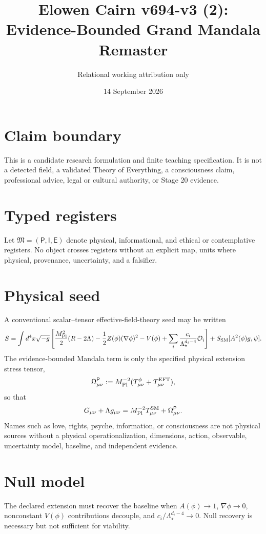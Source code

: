 \documentclass[11pt]{article}
\title{Elowen Cairn v694-v3 (2): Evidence-Bounded Grand Mandala Remaster}
\author{Relational working attribution only}
\date{14 September 2026}
\begin{document}
\maketitle
\section{Claim boundary}
This is a candidate research formulation and finite teaching specification. It is not a detected field, a validated Theory of Everything, a consciousness claim, professional advice, legal or cultural authority, or Stage 20 evidence.
\section{Typed registers}
Let $\mathfrak M=(\mathsf P,\mathsf I,\mathsf E)$ denote physical, informational, and ethical or contemplative registers. No object crosses registers without an explicit map, units where physical, provenance, uncertainty, and a falsifier.
\section{Physical seed}
A conventional scalar--tensor effective-field-theory seed may be written
\begin{equation}
S=\int d^4x\sqrt{-g}\left[\frac{M_{\rm Pl}^2}{2}(R-2\Lambda)-\frac12 Z(\phi)(\nabla\phi)^2-V(\phi)+\sum_i\frac{c_i}{\Lambda_\star^{d_i-4}}\mathcal O_i\right]+S_{\rm SM}[A^2(\phi)g,\psi].
\end{equation}
The evidence-bounded Mandala term is only the specified physical extension stress tensor,
\begin{equation}
\Omega_{\mu\nu}^{\mathsf P}:=M_{\rm Pl}^{-2}(T^{\phi}_{\mu\nu}+T^{\rm EFT}_{\mu\nu}),
\end{equation}
so that
\begin{equation}
G_{\mu\nu}+\Lambda g_{\mu\nu}=M_{\rm Pl}^{-2}T^{\rm SM}_{\mu\nu}+\Omega_{\mu\nu}^{\mathsf P}.
\end{equation}
Names such as love, rights, psyche, information, or consciousness are not physical sources without a physical operationalization, dimensions, action, observable, uncertainty model, baseline, and independent evidence.
\section{Null model}
The declared extension must recover the baseline when $A(\phi)\to1$, $\nabla\phi\to0$, nonconstant $V(\phi)$ contributions decouple, and $c_i/\Lambda_\star^{d_i-4}\to0$. Null recovery is necessary but not sufficient for viability.
\end{document}
